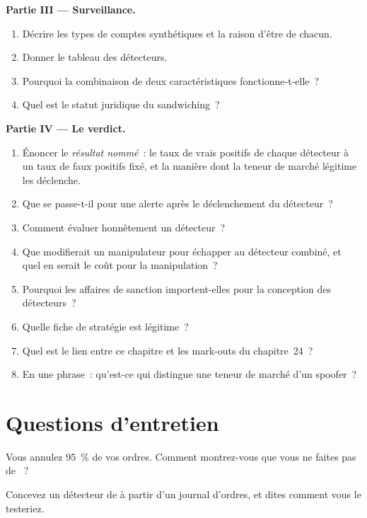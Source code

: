\begin{problem}
\medskip\noindent\textbf{Partie III --- Surveillance.}
\begin{enumerate}[resume]
\item Décrire les types de comptes synthétiques et la raison d'être de chacun.
\item Donner le tableau des détecteurs.
\item Pourquoi la combinaison de deux caractéristiques fonctionne-t-elle~?
\item Quel est le statut juridique du sandwiching~?
\end{enumerate}

\medskip\noindent\textbf{Partie IV --- Le verdict.}
\begin{enumerate}[resume]
\item Énoncer le \emph{résultat nommé}~: le taux de vrais positifs de chaque détecteur à un taux de faux positifs fixé, et la manière dont la teneur de marché légitime les déclenche.
\item Que se passe-t-il pour une alerte après le déclenchement du détecteur~?
\item Comment évaluer honnêtement un détecteur~?
\item Que modifierait un manipulateur pour échapper au détecteur combiné, et quel en serait le coût pour la manipulation~?
\item Pourquoi les affaires de sanction importent-elles pour la conception des détecteurs~?
\item Quelle fiche de stratégie est légitime~?
\item Quel est le lien entre ce chapitre et les mark-outs du chapitre~24~?
\item En une phrase~: qu'est-ce qui distingue une teneur de marché d'un spoofer~?
\end{enumerate}
\end{problem}

\section{Questions d'entretien}

\begin{interviewq}\label{iq:s2:manipulative-strategies-and-how-they-are-caught:1}
Vous annulez 95~\% de vos ordres. Comment montrez-vous que vous ne faites pas de ~?
\end{interviewq}

\begin{interviewq}\label{iq:s2:manipulative-strategies-and-how-they-are-caught:2}
Concevez un détecteur de  à partir d'un journal d'ordres, et dites comment vous le testeriez.
\end{interviewq}


